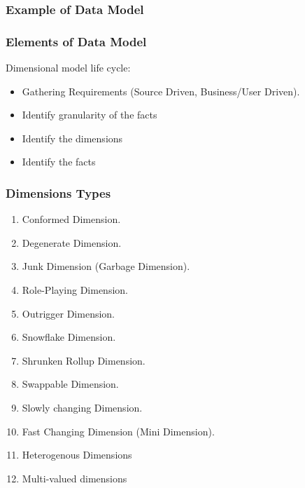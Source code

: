 \begin{frame}
    \frametitle{Example of Data Model}

    
\end{frame}

\begin{frame}
	\frametitle{Elements of Data Model}
		Dimensional model life cycle:
	    \begin{itemize}[<+->]
			\item Gathering Requirements (Source Driven, Business/User Driven).
			\item Identify granularity of the facts
			\item Identify the dimensions
			\item Identify the facts
	    \end{itemize}	
\end{frame}

\begin{frame}
\frametitle{Dimensions Types}
	\begin{enumerate}[<+->]
		\item Conformed Dimension.
		\item Degenerate Dimension.
		\item Junk Dimension (Garbage Dimension).
		\item Role-Playing Dimension.
		\item Outrigger Dimension.
		\item Snowflake Dimension.
		\item Shrunken Rollup Dimension.
		\item Swappable Dimension.
		\item Slowly changing Dimension.
		\item Fast Changing Dimension (Mini Dimension).
		\item Heterogenous Dimensions
		\item Multi-valued dimensions
	\end{enumerate}
\end{frame}